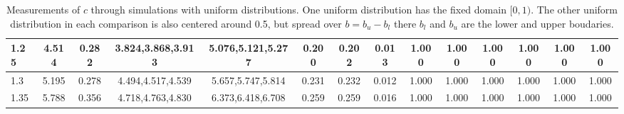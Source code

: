 \begin{table*}[h!]
\begin{center}
\begin{tabular}{| l | c | c | c | c | c | c | c | c | c | c | c | c | c |}
1.25 & 4.514 & 0.282 & 3.824,3.868,3.913 & 5.076,5.121,5.277  & 0.200  & 0.202  & 0.013  & 1.000  & 1.000  & 1.000  & 1.000  & 1.000  & 1.000 \\\hline
1.3 & 5.195 & 0.278 & 4.494,4.517,4.539 & 5.657,5.747,5.814  & 0.231  & 0.232  & 0.012  & 1.000  & 1.000  & 1.000  & 1.000  & 1.000  & 1.000 \\\hline
1.35 & 5.788 & 0.356 & 4.718,4.763,4.830 & 6.373,6.418,6.708  & 0.259  & 0.259  & 0.016  & 1.000  & 1.000  & 1.000  & 1.000  & 1.000  & 1.000 \\\hline
\end{tabular}
\caption{Measurements of $c$ through simulations
        with uniform distributions.
        One uniform distribution has the fixed domain $[0,1)$.
        The other uniform distribution in each comparison
        is also centered around 0.5,
        but spread over $b=b_u-b_l$ there $b_l$ and $b_u$ are the lower and upper boudaries.}
\end{center}
\end{table*}